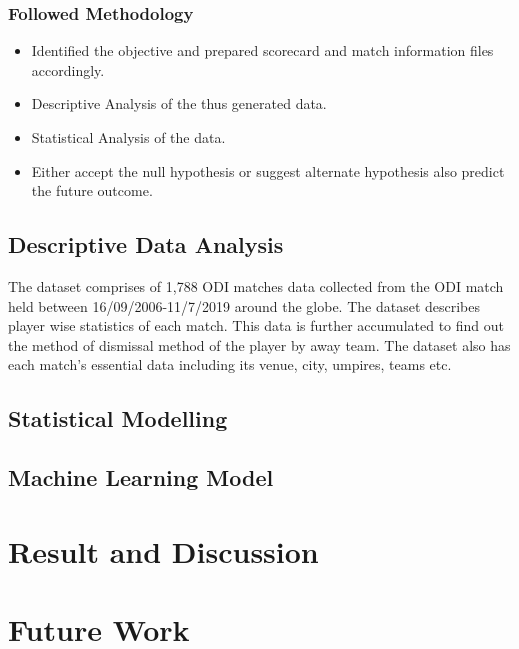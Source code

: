 \documentclass[fleqn,10pt]{wlscirep}
\begin{document}
\subsubsection{Followed Methodology}
\begin{itemize}
    \item Identified the objective and prepared scorecard and match information files accordingly.
    \item Descriptive Analysis of the thus generated data.
    \item Statistical Analysis of the data.
    \item Either accept the null hypothesis or suggest alternate hypothesis also predict the future outcome.
\end{itemize}

\subsection{Descriptive Data Analysis}
The dataset comprises of 1,788 ODI matches data collected from the ODI match held between 16/09/2006-11/7/2019 around the globe. 
The dataset describes player wise statistics of each match. This data is further accumulated to find out the 
method of dismissal method of the player by away team. 
The dataset also has each match's essential data including its venue, city, umpires, teams etc.
\subsection{Statistical Modelling}
\subsection{Machine Learning Model}
\section{Result and Discussion}
\section{Future Work}
\appendix
\end{document}
